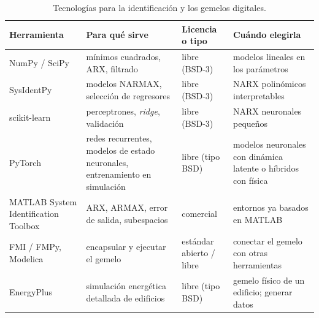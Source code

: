 \begin{table}[htbp]
\centering\footnotesize
\begin{tabularx}{\textwidth}{@{}>{\raggedright\arraybackslash}p{3.1cm}>{\raggedright\arraybackslash}X>{\raggedright\arraybackslash}p{2.0cm}>{\raggedright\arraybackslash}X@{}}
\toprule
Herramienta & Para qué sirve & Licencia o tipo & Cuándo elegirla \\
\midrule
NumPy / SciPy & mínimos cuadrados, ARX, filtrado & libre (BSD-3) & modelos lineales en los parámetros \\
SysIdentPy & modelos NARMAX, selección de regresores & libre (BSD-3) & NARX polinómicos interpretables \\
scikit-learn & perceptrones, \emph{ridge}, validación & libre (BSD-3) & NARX neuronales pequeños \\
PyTorch & redes recurrentes, modelos de estado neuronales, entrenamiento en simulación & libre (tipo BSD) & modelos neuronales con dinámica latente o híbridos con física \\
MATLAB System Identification Toolbox & ARX, ARMAX, error de salida, subespacios & comercial & entornos ya basados en MATLAB \\
FMI / FMPy, Modelica & encapsular y ejecutar el gemelo & estándar abierto / libre & conectar el gemelo con otras herramientas \\
EnergyPlus~\cite{crawley} & simulación energética detallada de edificios & libre (tipo BSD) & gemelo físico de un edificio; generar datos \\
\bottomrule
\end{tabularx}
\caption{Tecnologías para la identificación y los gemelos digitales.}
\label{tab:tec2}
\end{table}

\addtocounter{definicion}{1}%

